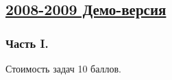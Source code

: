 \newpage
\subsection[2008-2009 Демо-версия]{\hyperref[sec:sol_kr_01_2008_2009_demo]{2008-2009 Демо-версия}}
\label{sec:kr_01_2008_2009_demo}

\subsubsection*{Часть I.}

Стоимость задач 10 баллов.


